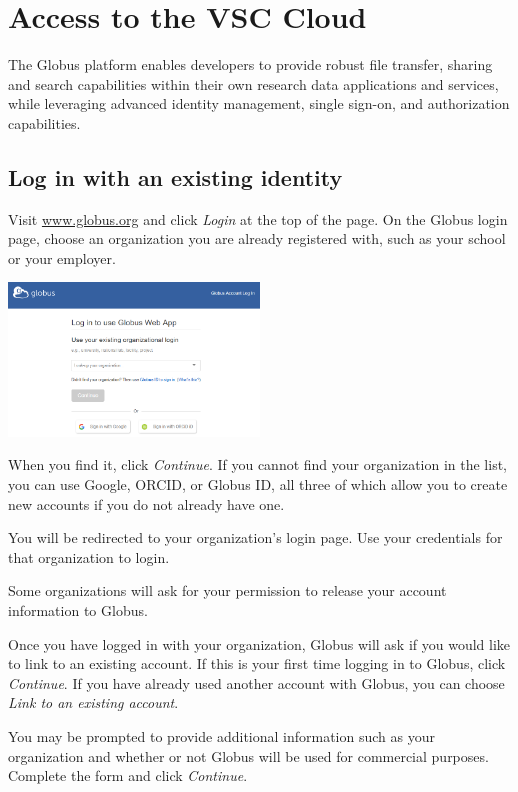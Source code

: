 \chapter{Access to the VSC Cloud}

The Globus platform enables developers to provide robust file transfer, sharing and search capabilities within their own research data applications and services, while leveraging advanced identity management, single sign-on, and authorization capabilities.

\section{Log in with an existing identity}\label{login}

Visit \href{https://www.globus.org}{www.globus.org} and click \emph{Login} at the top of the page. On the Globus login page, choose an organization you are already registered with, such as your school or your employer.

\begin{center}
\includegraphics[width=0.5\textwidth]{img/access-login-screen.png}
\end{center}

When you find it, click \emph{Continue}. If you cannot find your organization in the list, you can use Google, ORCID, or Globus ID, all three of which allow you to create new accounts if you do not already have one.

You will be redirected to your organization's login page. Use your credentials for that organization to login.

Some organizations will ask for your permission to release your account information to Globus.

Once you have logged in with your organization, Globus will ask if you would like to link to an existing account. If this is your first time logging in to Globus, click \emph{Continue}. If you have already used another account with Globus, you can choose \emph{Link to an existing account}.

You may be prompted to provide additional information such as your organization and whether or not Globus will be used for commercial purposes. Complete the form and click \emph{Continue}.

